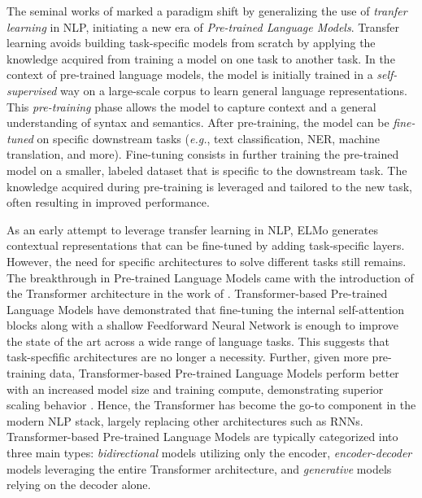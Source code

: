 The seminal works of \citet{peters-etal-2018-deep, devlin2018bert, radford2018improving} marked a paradigm shift by generalizing the use of \textit{tranfer learning} in \ac{NLP}, initiating a new era of \textit{Pre-trained Language Models}. Transfer learning avoids building task-specific models from scratch by applying the knowledge acquired from training a model on one task to another task. In the context of pre-trained language models, the model is initially trained in a \textit{self-supervised} way on a large-scale corpus to learn general language representations. This \textit{pre-training} phase allows the model to capture context and a general understanding of syntax and semantics. After pre-training, the model can be \textit{fine-tuned} on specific downstream tasks (\textit{e.g.}, text classification, \ac{NER}, machine translation, and more). Fine-tuning consists in further training the pre-trained model on a smaller, labeled dataset that is specific to the downstream task. The knowledge acquired during pre-training is leveraged and tailored to the new task, often resulting in improved performance.


As an early attempt to leverage transfer learning in \ac{NLP}, \ac{ELMo} generates contextual representations that can be fine-tuned by adding task-specific layers. However, the need for specific architectures to solve different tasks still remains. The breakthrough in Pre-trained Language Models came with the introduction of the Transformer architecture in the work of \citet{vaswani2017attention}. Transformer-based Pre-trained Language Models \citep{devlin2018bert, radford2018improving} have demonstrated that fine-tuning the internal self-attention blocks along with a shallow Feedforward Neural Network is enough to improve the state of the art across a wide range of language tasks. This suggests that task-specfific architectures are no longer a necessity. Further, given more pre-training data, Transformer-based Pre-trained Language Models perform better with an increased model size and training compute, demonstrating superior scaling behavior \citep{kaplan2020scaling}. Hence, the Transformer has become the go-to component in the modern \ac{NLP} stack, largely replacing other architectures such as \acp{RNN}. Transformer-based Pre-trained Language Models are typically categorized into three main types: \textit{bidirectional} models utilizing only the encoder, \textit{encoder-decoder} models leveraging the entire Transformer architecture, and \textit{generative} models relying on the decoder alone.

